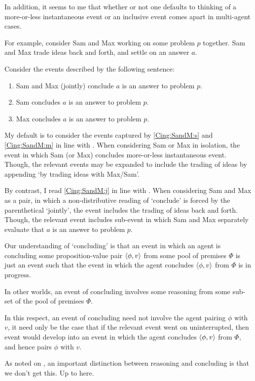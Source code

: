 \begin{note}
  In addition, it seems to me that whether or not one defaults to thinking of a more-or-less instantaneous event or an inclusive event comes apart in multi-agent cases.

  For example, consider Sam and Max working on some problem \(p\) together.
  Sam and Max trade ideas back and forth, and settle on an answer \(a\).

  Consider the events described by the following sentence:
  \begin{enumerate}[label=\arabic*., ref=(\arabic*)]
  \item
    \label{Cing:SandM:j}
    Sam and Max (jointly) conclude \(a\) is an answer to problem \(p\).
  \item
    \label{Cing:SandM:s}
    Sam concludes \(a\) is an answer to problem \(p\).
  \item
    \label{Cing:SandM:m}
    Max concludes \(a\) is an answer to problem \(p\).
  \end{enumerate}

  My default is to consider the events captured by \ref{Cing:SandM:s} and \ref{Cing:SandM:m} in line with \citeauthor{Gardner:1986wp}.
  When considering Sam or Max in isolation, the event in which Sam (or Max) concludes more-or-less instantaneous event.
  Though, the relevant events may be expanded to include the trading of ideas by appending `by trading ideas with Max/Sam'.

  By contrast, I read \ref{Cing:SandM:j} in line with \citeauthor{Bratman:1979aa}.
  When considering Sam and Max as a pair, in which a non-distributive reading of `conclude' is forced by the parenthetical `jointly', the event includes the trading of ideas back and forth.
  Though, the relevant event includes sub-event in which Sam and Max separately evaluate that \(a\) is an answer to problem \(p\).
\end{note}

\begin{note}
  Our understanding of `concluding' is that an event in which an agent is concluding some proposition-value pair \(\langle \phi, v \rangle\) from some pool of premises \(\Phi\) is just an event such that the event in which the agent concludes \(\langle \phi, v \rangle\) from \(\Phi\) is in progress.

  In other worlds, an event of concluding involves some reasoning from some sub-set of the pool of premises \(\Phi\).

  In this respect, an event of concluding need not involve the agent pairing \(\phi\) with \(v\), it need only be the case that if the relevant event went on uninterrupted, then event would develop into an event in which the agent concludes \(\langle \phi, v \rangle\) from \(\Phi\), and hence pairs \(\phi\) with \(v\).

  As noted on , an important distinction between reasoning and concluding is that we don't get this.
  {
    \color{red} Up to here.
  }
\end{note}

